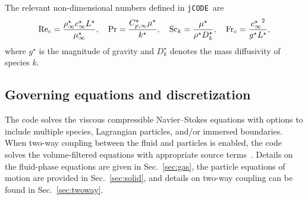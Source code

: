 \documentclass[12pt]{article}
\newcommand{\code}[1]{\texttt{#1}}
\newcommand{\Frc}{\mbox{\rm Fr}_c} %
\newcommand{\Rec}{\mbox{\rm Re}_c} %
\newcommand{\Sc}{\mbox{\rm Sc}} %
\newcommand{\jcode}{\code{jCODE}~}
\begin{document}
The relevant non-dimensional numbers defined in \jcode are
\begin{align}\label{No_ndj}
\Rec = \frac{\rho_{\infty}^{\star} c_{\infty}^{\star} L^{\star} }{\mu_{\infty}^{\star}},  \quad \Pr = \frac{C_{p,\infty}^{\star} \mu^{\star}}{k^{\star}}, \quad \Sc_k = \frac{\mu^{\star}}{\rho^{\star}D_k^{\star}}, \quad \Frc = \frac{{c_{\infty}^{\star}}^2}{g^{\star} L^{\star}},
\end{align}
where $g^\star$ is the magnitude of gravity and $D_k^{\star}$ denotes the mass diffusivity of species $k$. %

\subsection{Governing equations and discretization\label{sec:Equations}}
The code solves the viscous compressible Navier--Stokes equations with options to include multiple species, Lagrangian particles, and/or immersed boundaries. When two-way coupling between the fluid and particles is enabled, the code solves the volume-filtered equations with appropriate source terms~\cite{shallcross2020volume}. Details on the fluid-phase equations are given in Sec.~\ref{sec:gas}, the particle equations of motion are provided in Sec.~\ref{sec:solid}, and details on two-way coupling can be found in Sec.~\ref{sec:twoway}.
\end{document}
